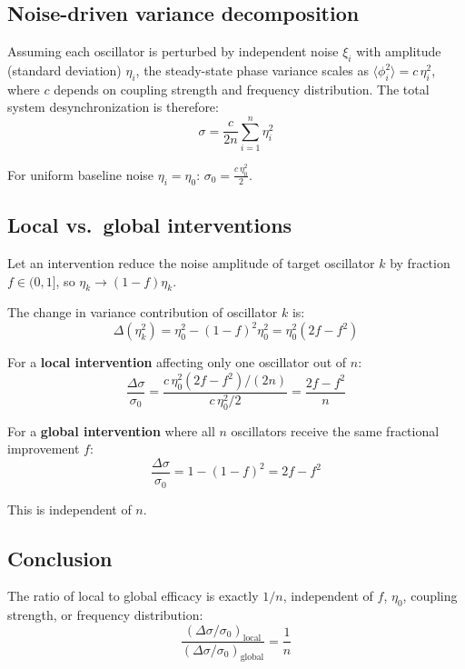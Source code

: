 \documentclass[12pt]{article}
\begin{document}
\subsection{Noise-driven variance decomposition}

Assuming each oscillator is perturbed by independent noise $\xi_i$ with
amplitude (standard deviation) $\eta_i$, the steady-state phase variance scales
as $\langle\phi_i^2\rangle = c\,\eta_i^2$, where $c$ depends on coupling
strength and frequency distribution. The total system desynchronization is
therefore:
\begin{equation}
\sigma = \frac{c}{2n}\sum_{i=1}^{n}\eta_i^2
\end{equation}

For uniform baseline noise $\eta_i = \eta_0$:
$\sigma_0 = \frac{c\,\eta_0^2}{2}$.

\subsection{Local vs.\ global interventions}

Let an intervention reduce the noise amplitude of target oscillator $k$ by
fraction $f \in (0,1]$, so $\eta_k \to (1-f)\eta_k$.

The change in variance contribution of oscillator $k$ is:
\begin{equation}
\Delta(\eta_k^2) = \eta_0^2 - (1-f)^2\eta_0^2 = \eta_0^2(2f - f^2)
\end{equation}

For a \textbf{local intervention} affecting only one oscillator out of $n$:
\begin{equation}
\frac{\Delta\sigma}{\sigma_0}
= \frac{c\,\eta_0^2(2f-f^2)/(2n)}{c\,\eta_0^2/2}
= \frac{2f - f^2}{n}
\label{eq:app_local}
\end{equation}

For a \textbf{global intervention} where all $n$ oscillators receive the same
fractional improvement $f$:
\begin{equation}
\frac{\Delta\sigma}{\sigma_0} = 1 - (1-f)^2 = 2f - f^2
\label{eq:app_global}
\end{equation}

This is independent of $n$.

\subsection{Conclusion}

The ratio of local to global efficacy is exactly $1/n$, independent of $f$,
$\eta_0$, coupling strength, or frequency distribution:
\begin{equation}
\frac{(\Delta\sigma/\sigma_0)_\text{local}}{(\Delta\sigma/\sigma_0)_\text{global}}
= \frac{1}{n}
\end{equation}
\end{document}
